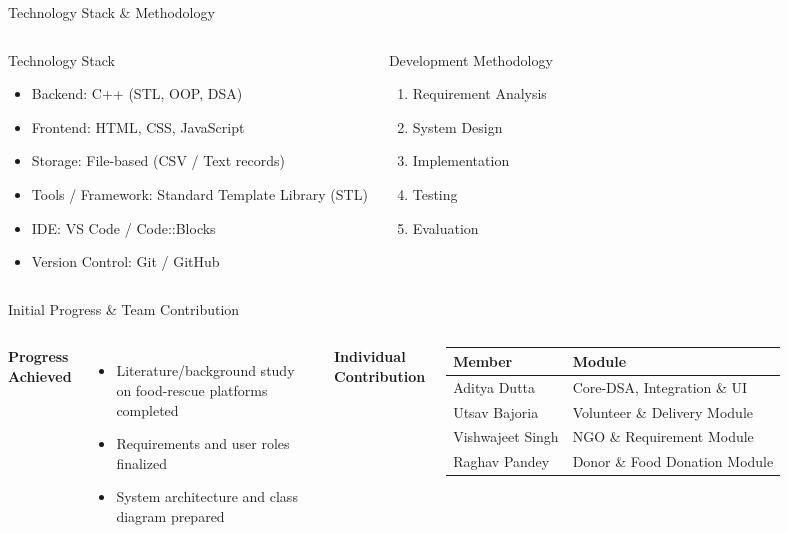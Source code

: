 \documentclass[aspectratio=169,11pt]{beamer}
\begin{document}
\begin{frame}{Technology Stack \& Methodology}
\begin{columns}[T,totalwidth=\textwidth]
\begin{block}{Technology Stack}
\begin{itemize}\itemsep2pt
\item Backend: C++ (STL, OOP, DSA)
\item Frontend: HTML, CSS, JavaScript
\item Storage: File-based (CSV / Text records)
\item Tools / Framework: Standard Template Library (STL)
\item IDE: VS Code / Code::Blocks 
\item Version Control: Git / GitHub
\end{itemize}
\end{block}
\begin{block}{Development Methodology}
\begin{enumerate}\itemsep2pt
\item Requirement Analysis
\item System Design
\item Implementation
\item Testing
\item Evaluation
\end{enumerate}
\end{block}
\end{columns}
\vfill
\begin{center}
\end{center}
\end{frame}

\begin{frame}{Initial Progress \& Team Contribution}
\begin{columns}[T,totalwidth=\textwidth]
\textbf{\color{GEUBlue}Progress Achieved}
\begin{itemize}\itemsep3pt
\item Literature/background study on food-rescue platforms completed
\item Requirements and user roles finalized
\item System architecture and class diagram prepared
\end{itemize}
\textbf{\color{GEUBlue}Individual Contribution}
\vspace{2mm}
\small
\begin{tabularx}{\textwidth}{@{}p{2.6cm}X@{}}
\toprule
Member & Module\\
\midrule
Aditya Dutta & Core-DSA, Integration \& UI \\
Utsav Bajoria & Volunteer \& Delivery Module \\
Vishwajeet Singh & NGO \& Requirement Module \\
Raghav Pandey &Donor \& Food Donation Module \\
\bottomrule
\end{tabularx}
\end{columns}
\end{frame}
\end{document}
